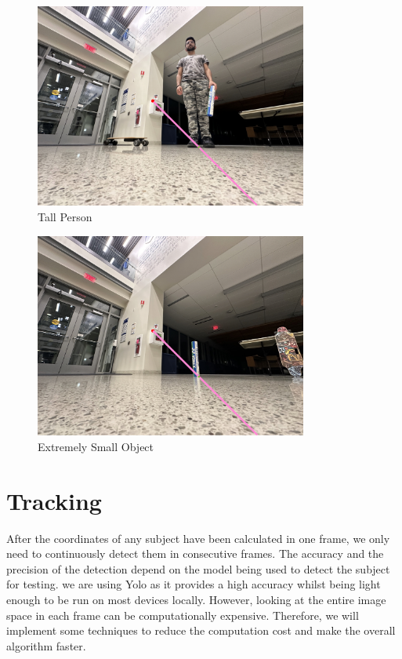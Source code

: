 \documentclass[12pt]{report}
\begin{document}
\begin{figure}[H]
    \centering
    \includegraphics[width=0.8\textwidth]{3vpto.jpeg}
    \caption{Tall Person}
    \label{fig: Tall person}
\end{figure}

\begin{figure}[H]
    \centering
    \includegraphics[width=0.8\textwidth]{3vpso.jpeg}
    \caption{Extremely Small Object}
    \label{fig: Extremely small object}
\end{figure}

\section{Tracking}

After the coordinates of any subject have been calculated in one frame, we only need to continuously detect them in consecutive frames. The accuracy and the precision of the detection depend on the model being used to detect the subject for testing. we are using Yolo as it provides a high accuracy whilst being light enough to be run on most devices locally. However, looking at the entire image space in each frame can be computationally expensive. Therefore, we will implement some techniques to reduce the computation cost and make the overall algorithm faster.\newline
\end{document}
